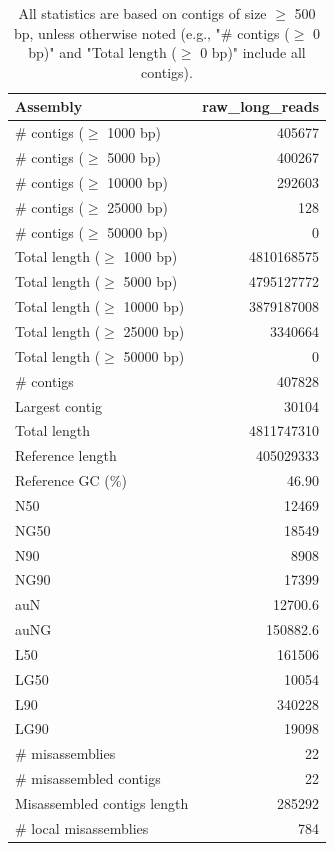 \documentclass[12pt,a4paper]{article}
\begin{document}
\begin{table}[ht]
\begin{center}
\caption{All statistics are based on contigs of size $\geq$ 500 bp, unless otherwise noted (e.g., "\# contigs ($\geq$ 0 bp)" and "Total length ($\geq$ 0 bp)" include all contigs).}
\begin{tabular}{|l*{1}{|r}|}
\hline
Assembly & raw\_long\_reads \\ \hline
\# contigs ($\geq$ 1000 bp) & 405677 \\ \hline
\# contigs ($\geq$ 5000 bp) & 400267 \\ \hline
\# contigs ($\geq$ 10000 bp) & 292603 \\ \hline
\# contigs ($\geq$ 25000 bp) & 128 \\ \hline
\# contigs ($\geq$ 50000 bp) & 0 \\ \hline
Total length ($\geq$ 1000 bp) & 4810168575 \\ \hline
Total length ($\geq$ 5000 bp) & 4795127772 \\ \hline
Total length ($\geq$ 10000 bp) & 3879187008 \\ \hline
Total length ($\geq$ 25000 bp) & 3340664 \\ \hline
Total length ($\geq$ 50000 bp) & 0 \\ \hline
\# contigs & 407828 \\ \hline
Largest contig & 30104 \\ \hline
Total length & 4811747310 \\ \hline
Reference length & 405029333 \\ \hline
Reference GC (\%) & 46.90 \\ \hline
N50 & 12469 \\ \hline
NG50 & 18549 \\ \hline
N90 & 8908 \\ \hline
NG90 & 17399 \\ \hline
auN & 12700.6 \\ \hline
auNG & 150882.6 \\ \hline
L50 & 161506 \\ \hline
LG50 & 10054 \\ \hline
L90 & 340228 \\ \hline
LG90 & 19098 \\ \hline
\# misassemblies & 22 \\ \hline
\# misassembled contigs & 22 \\ \hline
Misassembled contigs length & 285292 \\ \hline
\# local misassemblies & 784 \\ \hline

\end{tabular}
\end{center}
\end{table}
\end{document}
